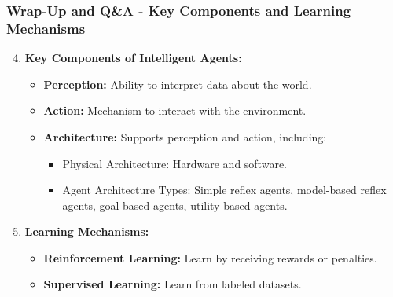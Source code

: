 \documentclass[aspectratio=169]{beamer}
\begin{document}
\begin{frame}[fragile]
    \frametitle{Wrap-Up and Q\&A - Key Components and Learning Mechanisms}
    
    \begin{enumerate}
        \setcounter{enumi}{3}
        \item \textbf{Key Components of Intelligent Agents:}
            \begin{itemize}
                \item \textbf{Perception:} Ability to interpret data about the world.
                \item \textbf{Action:} Mechanism to interact with the environment.
                \item \textbf{Architecture:} Supports perception and action, including:
                    \begin{itemize}
                        \item Physical Architecture: Hardware and software.
                        \item Agent Architecture Types: Simple reflex agents, model-based reflex agents, goal-based agents, utility-based agents.
                    \end{itemize}
            \end{itemize}
        
        \item \textbf{Learning Mechanisms:}
            \begin{itemize}
                \item \textbf{Reinforcement Learning:} Learn by receiving rewards or penalties.
                \item \textbf{Supervised Learning:} Learn from labeled datasets.
            \end{itemize}
    \end{enumerate}
\end{frame}
\end{document}
